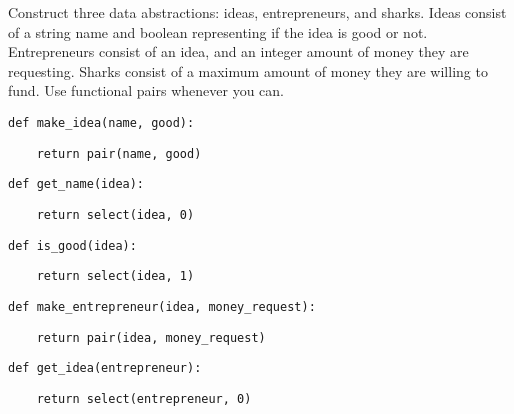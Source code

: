 \question
Construct three data abstractions: ideas, entrepreneurs,
and sharks.
Ideas consist of a string name
and boolean representing if the idea is good or not.
Entrepreneurs consist of an idea,
and an integer amount of money they are requesting.
Sharks consist of a maximum
amount of money they are willing to fund.
Use functional pairs whenever you can.
\\

\begin{lstlisting}
def make_idea(name, good):
\end{lstlisting}
\begin{solution}[0.5in]
\begin{lstlisting}
    return pair(name, good)
\end{lstlisting}
\end{solution}

\begin{lstlisting}
def get_name(idea):
\end{lstlisting}
\begin{solution}[0.5in]
\begin{lstlisting}
    return select(idea, 0)
\end{lstlisting}
\end{solution}

\begin{lstlisting}
def is_good(idea):
\end{lstlisting}
\begin{solution}[0.5in]
\begin{lstlisting}
    return select(idea, 1)
\end{lstlisting}
\end{solution}

\begin{lstlisting}
def make_entrepreneur(idea, money_request):
\end{lstlisting}
\begin{solution}[0.5in]
\begin{lstlisting}
    return pair(idea, money_request)
\end{lstlisting}
\end{solution}

\begin{lstlisting}
def get_idea(entrepreneur):
\end{lstlisting}
\begin{solution}[0.5in]
\begin{lstlisting}
    return select(entrepreneur, 0)
\end{lstlisting}
\end{solution}

